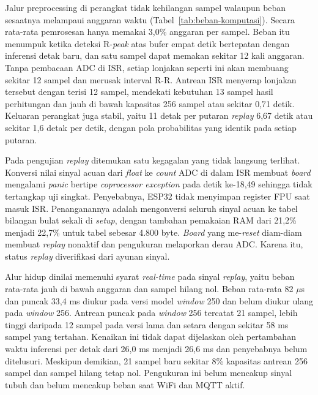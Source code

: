 Jalur preprocessing di perangkat tidak kehilangan sampel walaupun beban sesaatnya melampaui anggaran waktu (Tabel~\ref{tab:beban-komputasi}). Secara rata-rata pemrosesan hanya memakai 3,0\% anggaran per sampel. Beban itu menumpuk ketika deteksi R-\textit{peak} atas bufer empat detik bertepatan dengan inferensi detak baru, dan satu sampel dapat memakan sekitar 12 kali anggaran. Tanpa pembacaan ADC di ISR, setiap lonjakan seperti ini akan membuang sekitar 12 sampel dan merusak interval R-R. Antrean ISR menyerap lonjakan tersebut dengan terisi 12 sampel, mendekati kebutuhan 13 sampel hasil perhitungan dan jauh di bawah kapasitas 256 sampel atau sekitar 0,71 detik. Keluaran perangkat juga stabil, yaitu 11 detak per putaran \textit{replay} 6,67 detik atau sekitar 1,6 detak per detik, dengan pola probabilitas yang identik pada setiap putaran.

Pada pengujian \textit{replay} ditemukan satu kegagalan yang tidak langsung terlihat. Konversi nilai sinyal acuan dari \textit{float} ke \textit{count} ADC di dalam ISR membuat \textit{board} mengalami \textit{panic} bertipe \textit{coprocessor exception} pada detik ke-18,49 sehingga tidak tertangkap uji singkat. Penyebabnya, ESP32 tidak menyimpan register FPU saat masuk ISR. Penanganannya adalah mengonversi seluruh sinyal acuan ke tabel bilangan bulat sekali di \textit{setup}, dengan tambahan pemakaian RAM dari 21,2\% menjadi 22,7\% untuk tabel sebesar 4.800 byte. \textit{Board} yang me-\textit{reset} diam-diam membuat \textit{replay} nonaktif dan pengukuran melaporkan derau ADC. Karena itu, status \textit{replay} diverifikasi dari ayunan sinyal.

Alur hidup dinilai memenuhi syarat \textit{real-time} pada sinyal \textit{replay}, yaitu beban rata-rata jauh di bawah anggaran dan sampel hilang nol. Beban rata-rata 82 $\mu$s dan puncak 33,4 ms diukur pada versi model \textit{window} 250 dan belum diukur ulang pada \textit{window} 256. Antrean puncak pada \textit{window} 256 tercatat 21 sampel, lebih tinggi daripada 12 sampel pada versi lama dan setara dengan sekitar 58 ms sampel yang tertahan. Kenaikan ini tidak dapat dijelaskan oleh pertambahan waktu inferensi per detak dari 26,0 ms menjadi 26,6 ms dan penyebabnya belum ditelusuri. Meskipun demikian, 21 sampel baru sekitar 8\% kapasitas antrean 256 sampel dan sampel hilang tetap nol. Pengukuran ini belum mencakup sinyal tubuh dan belum mencakup beban saat WiFi dan MQTT aktif.

